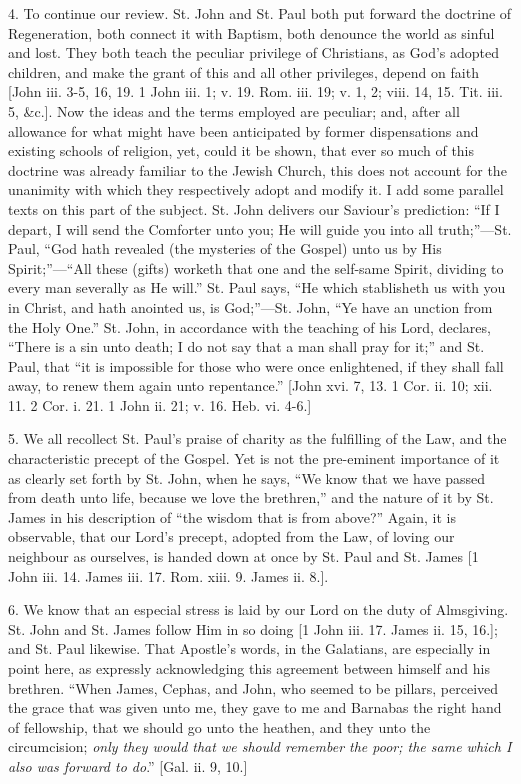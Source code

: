 4. To continue our review. St. John and St. Paul both put forward the
doctrine of Regeneration, both connect it with Baptism, both denounce
the world as sinful and lost. They both teach the peculiar privilege of
Christians, as God's adopted children, and make the grant of this and
all other privileges, depend on faith [John iii. 3-5, 16, 19. 1 John
iii. 1; v. 19. Rom. iii. 19; v. 1, 2; viii. 14, 15. Tit. iii. 5,
\&c.]. Now the ideas and the terms employed are peculiar; and, after
all allowance for what might have been anticipated by former
dispensations and existing schools of religion, yet, could it be shown,
that ever so much of this doctrine was already familiar to the Jewish
Church, this does not account for the unanimity with which they
respectively adopt and modify it. I add some parallel texts on this part
of the subject. St. John delivers our Saviour's prediction: ``If I
depart, I will send the Comforter unto you; He will guide you into all
truth;''—St. Paul, ``God hath revealed (the mysteries of the
Gospel) unto us by His Spirit;''—``All these (gifts) worketh
that one and the self-same Spirit, dividing to every man severally as He
will.'' St. Paul says, ``He which stablisheth us with you in
Christ, and hath anointed us, is God;''—St. John, ``Ye have an
unction from the Holy One.'' St. John, in accordance with the
teaching of his Lord, declares, ``There is a sin unto death; I do
not say that a man shall pray for it;'' and St. Paul, that ``it
is impossible for those who were once enlightened, if they shall fall
away, to renew them again unto repentance.'' [John xvi. 7, 13. 1 Cor.
ii. 10; xii. 11. 2 Cor. i. 21. 1 John ii. 21; v. 16. Heb. vi. 4-6.]

5. We all recollect St. Paul's praise of charity as the fulfilling of
the Law, and the characteristic precept of the Gospel. Yet is not the
pre-eminent importance of it as clearly set forth by St. John, when he
says, ``We know that we have passed from death unto life, because we
love the brethren,'' and the nature of it by St. James in his
description of ``the wisdom that is from above?'' Again, it is
observable, that our Lord's precept, adopted from the Law, of loving our
neighbour as ourselves, is handed down at once by St. Paul and St. James
[1 John iii. 14. James iii. 17. Rom. xiii. 9. James ii. 8.].

6. We know that an especial stress is laid by our Lord on the duty of
Almsgiving. St. John and St. James follow Him in so doing [1 John iii.
17. James ii. 15, 16.]; and St. Paul likewise. That Apostle's words, in
the Galatians, are especially in point here, as expressly acknowledging
this agreement between himself and his brethren. ``When James,
Cephas, and John, who seemed to be pillars, perceived the grace that was
given unto me, they gave to me and Barnabas the right hand of
fellowship, that we should go unto the heathen, and they unto the
circumcision; \emph{only they would that we should remember the poor; the
same which I also was forward to do}.'' [Gal. ii. 9, 10.]

